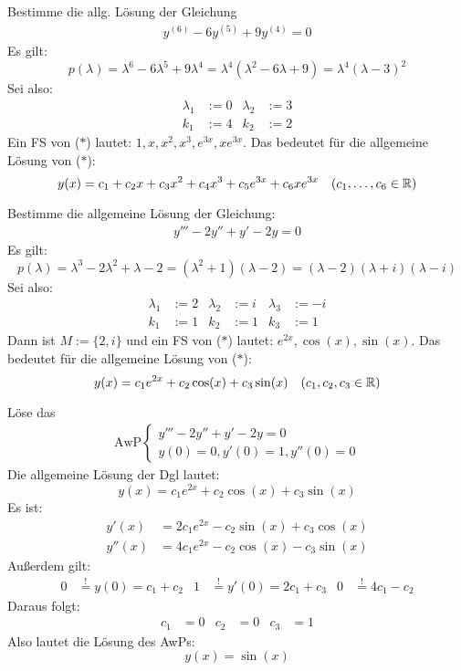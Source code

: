 \documentclass[a4paper,oneside,DIV15,BCOR12mm,chapterprefix=true,headings=onelinechapter]{scrbook}
\begin{document}
\begin{beispiele}
\item Bestimme die allg. Lösung der Gleichung
\begin{align*}
\tag{$*$} y^{(6)}-6y^{(5)}+9y^{(4)}=0
\end{align*}
Es gilt:
\[p(\lambda)=\lambda^6-6\lambda^5+9\lambda^4=\lambda^4(\lambda^2-6\lambda+9)=\lambda^4(\lambda-3)^2\]
Sei also:
\begin{align*}
\lambda_1&:=0&\lambda_2&:=3\\
k_1&:=4&k_2&:=2
\end{align*}
Ein FS von ($*$) lautet: $1,x,x^2,x^3,e^{3x},xe^{3x}$. Das bedeutet für die allgemeine Lösung von ($*$):
\[y(x)=c_1+c_2x+c_3x^2+c_4x^3+c_5e^{3x}+c_6xe^{3x}\quad(c_1,\ldots,c_6\in\mathbb{R})\]
\item Bestimme die allgemeine Lösung der Gleichung:
\begin{align*}
\tag{$*$} y'''-2y''+y'-2y=0
\end{align*}
Es gilt:
\[p(\lambda)=\lambda^3-2\lambda^2+\lambda-2=(\lambda^2+1)(\lambda-2)=(\lambda-2)(\lambda+i)(\lambda-i)\]
Sei also:
\begin{align*}
\lambda_1&:=2&\lambda_2&:=i&\lambda_3&:=-i\\
k_1&:=1&k_2&:=1&k_3&:=1
\end{align*}
Dann ist $M:=\{2,i\}$ und ein FS von ($*$) lautet: $e^{2x},\cos(x),\sin(x)$. Das bedeutet für
die allgemeine Lösung von ($*$):
\[y(x)=c_1e^{2x}+c_2\cos(x)+c_3\sin(x)\quad (c_1,c_2,c_3\in\mathbb{R})\]
\item Löse das
\begin{align*}
\text{AwP}
\begin{cases}
y'''-2y''+y'-2y=0\\
y(0)=0,y'(0)=1,y''(0)=0
\end{cases}
\end{align*}
Die allgemeine Lösung der Dgl lautet:
\[y(x)=c_1e^{2x}+c_2\cos(x)+c_3\sin(x)\]
Es ist:
\begin{align*}
y'(x)&=2c_1e^{2x}-c_2\sin(x)+c_3\cos(x)\\
y''(x)&=4c_1e^{2x}-c_2\cos(x)-c_3\sin(x)
\end{align*}
Außerdem gilt:
\begin{align*}
0&\stackrel!=y(0)=c_1+c_2&1&\stackrel!=y'(0)=2c_1+c_3&0&\stackrel!=4c_1-c_2
\end{align*} 
Daraus folgt:
\begin{align*}
c_1&=0&c_2&=0&c_3&=1
\end{align*}
Also lautet die Lösung des AwPs:
\[y(x)=\sin(x)\]
\end{beispiele}
\end{document}

